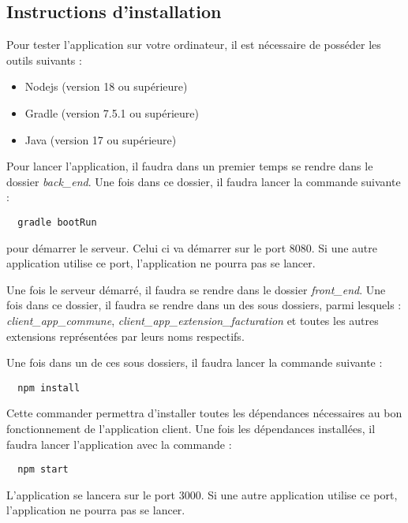 \documentclass[../rapport.tex]{subfiles}
\begin{document}
\subsection{Instructions d'installation}

Pour tester l'application sur votre ordinateur, il est nécessaire de posséder les outils suivants : 

\begin{itemize}
    \item Nodejs (version 18 ou supérieure)
    \item Gradle (version 7.5.1 ou supérieure)
    \item Java (version 17 ou supérieure)
\end{itemize}

Pour lancer l'application, il faudra dans un premier temps se rendre dans le dossier \textit{back\_end}. Une fois dans ce dossier, il faudra lancer la commande suivante : 

\begin{lstlisting}
  gradle bootRun
\end{lstlisting}

pour démarrer le serveur. Celui ci va démarrer sur le port 8080. Si une autre application utilise ce port, l'application ne pourra pas se lancer.

Une fois le serveur démarré, il faudra se rendre dans le dossier \textit{front\_end}. Une fois dans ce dossier, il faudra se rendre dans un des sous dossiers, parmi lesquels : \textit{client\_app\_commune}, \textit{client\_app\_extension\_facturation} et toutes les autres extensions représentées par leurs noms respectifs.

Une fois dans un de ces sous dossiers, il faudra lancer la commande suivante : 

\begin{lstlisting}
  npm install
\end{lstlisting}

Cette commander permettra d'installer toutes les dépendances nécessaires au bon fonctionnement de l'application client. Une fois les dépendances installées, il faudra lancer l'application avec la commande : 

\begin{lstlisting}
  npm start
\end{lstlisting}

L'application se lancera sur le port 3000. Si une autre application utilise ce port, l'application ne pourra pas se lancer.
\end{document}
